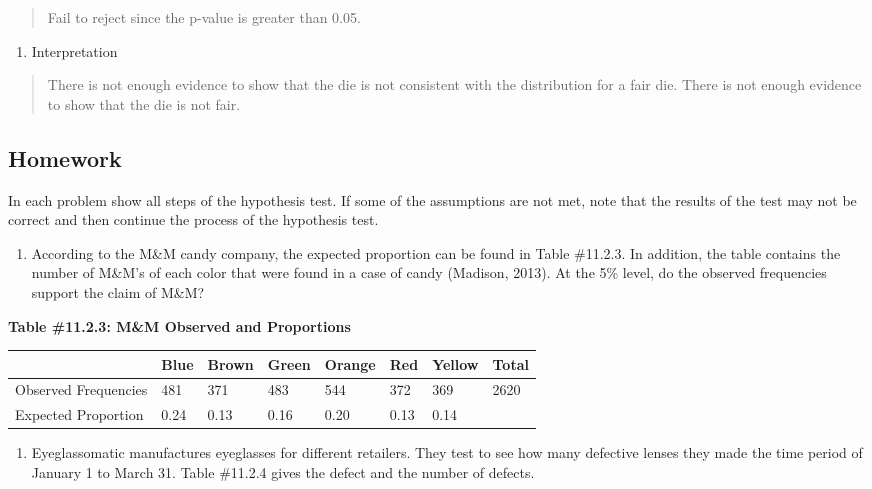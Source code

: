 \documentclass[]{book}
\providecommand{\tightlist}{%
  \setlength{\itemsep}{0pt}\setlength{\parskip}{0pt}}
\begin{document}
\begin{quote}
Fail to reject since the p-value is greater than 0.05.
\end{quote}

\begin{enumerate}
\def\labelenumi{\arabic{enumi}.}
\setcounter{enumi}{4}
\tightlist
\item
  Interpretation
\end{enumerate}

\begin{quote}
There is not enough evidence to show that the die is not consistent with the distribution for a fair die. There is not enough evidence to show that the die is not fair.
\end{quote}

\hypertarget{homework-33}{%
\subsection{Homework}\label{homework-33}}

In each problem show all steps of the hypothesis test. If some of the assumptions are not met, note that the results of the test may not be correct and then continue the process of the hypothesis test.

\begin{enumerate}
\def\labelenumi{\arabic{enumi}.}
\tightlist
\item
  According to the M\&M candy company, the expected proportion can be found in Table \#11.2.3. In addition, the table contains the number of M\&M's of each color that were found in a case of candy (Madison, 2013). At the 5\% level, do the observed frequencies support the claim of M\&M?
\end{enumerate}

\textbf{Table \#11.2.3: M\&M Observed and Proportions}

\begin{longtable}[]{@{}llllllll@{}}
\toprule
& Blue & Brown & Green & Orange & Red & Yellow & Total\tabularnewline
\midrule
\endhead
Observed Frequencies & 481 & 371 & 483 & 544 & 372 & 369 & 2620\tabularnewline
Expected Proportion & 0.24 & 0.13 & 0.16 & 0.20 & 0.13 & 0.14 &\tabularnewline
\bottomrule
\end{longtable}

\begin{enumerate}
\def\labelenumi{\arabic{enumi}.}
\setcounter{enumi}{1}
\tightlist
\item
  Eyeglassomatic manufactures eyeglasses for different retailers. They test to see how many defective lenses they made the time period of January 1 to March 31. Table \#11.2.4 gives the defect and the number of defects.
\end{enumerate}
\end{document}
